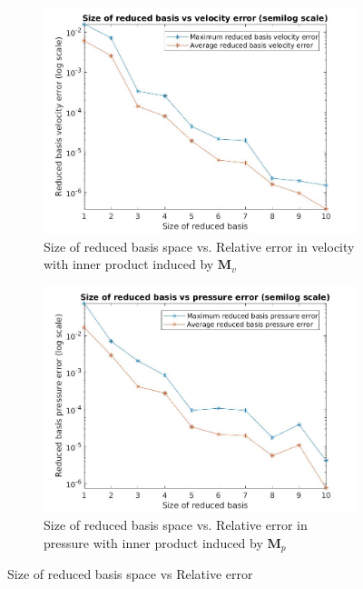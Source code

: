 \documentclass[graybox]{svmult}
\begin{document}
\begin{figure}[H]
\begin{subfigure}{0.48\textwidth}
\includegraphics[width=\linewidth]{size_vs_reduced_basis_velocity_error_semilog.jpg}
\caption{Size of reduced basis space vs. Relative error in velocity with inner product induced by $\bm{M}_v$} \label{error_vs_basis_velocity}
\end{subfigure}\hspace*{\fill}
\begin{subfigure}{0.48\textwidth}
\includegraphics[width=\linewidth]{size_vs_reduced_basis_pressure_error_semilog.jpg}
\caption{Size of reduced basis space vs. Relative error in pressure with inner product induced by $\bm{M}_p$} \label{error_vs_basis_pressure}
\end{subfigure}
  \caption{Size of reduced basis space vs Relative error} 
\label{error_vs_basis}
\end{figure}
\end{document}
